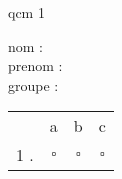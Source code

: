\documentclass[a4paper]{article}
\begin{document}
	\begin{center}
		qcm 1
	\end{center}
	nom :\\
	prenom :\\
	groupe :
	\begin{center}
		\begin{tabular}{*{4}{c}}
			&a&b&c\\
			1 . &$\square$&$\square$&$\square$\\
		\end{tabular}
	\end{center}
	\newpage
\end{document}
